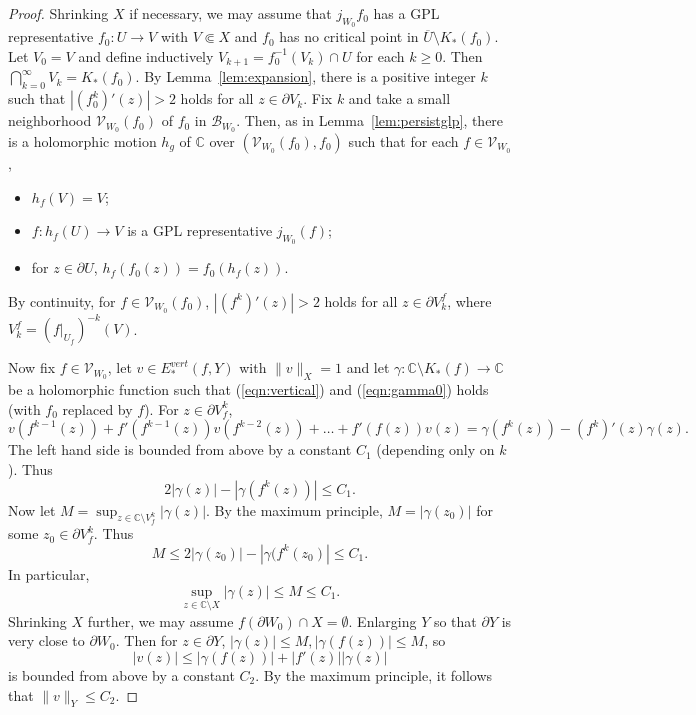 \documentclass{amsart}
\numberwithin{equation}{section}
\theoremstyle{definition}
\theoremstyle{remark}
\begin{document}
\begin{proof} Shrinking $X$ if necessary, we may assume that $j_{W_0}f_0$ has a GPL representative $f_0: U\to V$ with $V\Subset X$ and $f_0$ has no critical point in $\overline{U}\setminus K_*(f_0)$. Let $V_0=V$ and define inductively $V_{k+1}=f_0^{-1}(V_k)\cap U$ for each $k\ge 0$. Then $\bigcap_{k=0}^\infty V_k=K_*(f_0)$. By Lemma~\ref{lem:expansion}, there is a positive integer $k$ such that $|(f_0^k)'(z)|> 2$ holds for all $z\in \partial V_k$. 
Fix $k$ and take a small neighborhood $\mathcal{V}_{W_0}(f_0)$ of $f_0$ in $\mathcal{B}_{W_0}$.
Then, as in Lemma~\ref{lem:persistglp}, there is a holomorphic motion $h_g$ of $\mathbb{C}$ over $(\mathcal{V}_{W_0}(f_0), f_0)$ such that for each $f\in \mathcal{V}_{W_0}$,
\begin{itemize}
\item $h_f(V)=V$; 
\item $f: h_f(U)\to V$ is a GPL representative $j_{W_0}(f)$;     
\item for $z\in \partial U$, $h_f(f_0(z))=f_0(h_f(z))$. 
\end{itemize}
By continuity, for $f\in \mathcal{V}_{W_0}(f_0)$, $|(f^k)'(z)|>2$ holds for all $z\in \partial V_k^f$, where $V_k^f=(f|_{U_f})^{-k}(V)$.


Now fix $f\in \mathcal{V}_{W_0}$, let $v\in E^{vert}_*(f, Y)$ with $\|v\|_{X}=1$ and let $\gamma:\mathbb{C}\setminus K_*(f)\to \mathbb{C}$ be a holomorphic function such that (\ref{eqn:vertical}) and (\ref{eqn:gamma0}) holds (with $f_0$ replaced by $f$). 
For $z\in \partial V^k_f$, 
$$v(f^{k-1}(z))+f'(f^{k-1}(z))v(f^{k-2}(z))+\dots+ f'(f(z)) v(z)  =\gamma(f^k(z))-(f^k)'(z) \gamma(z).$$
The left hand side is bounded from above by a constant $C_1$ (depending only on  $k$). Thus 
$$2|\gamma(z)|-|\gamma(f^k(z))|\le C_1.$$
Now let $M=\sup_{z\in \mathbb{C}\setminus V_f^k} |\gamma(z)|$. 
By the maximum principle, $M=|\gamma(z_0)|$ for some $z_0\in\partial V^k_f$. 
Thus $$M\le 2|\gamma(z_0)|-|\gamma(f^k(z_0)|\le C_1.$$ 
In particular, $$\sup_{z\in \mathbb{C}\setminus X} |\gamma(z)|\le M\le C_1.$$
Shrinking $X$ further, we may assume $f(\partial W_0)\cap X=\emptyset$. Enlarging $Y$ so that $\partial Y$ is very close to $\partial W_0$. Then for $z\in \partial Y$, $|\gamma(z)|\le M, |\gamma(f(z))|\le M$, so
$$|v(z)|\le |\gamma(f(z))|+|f'(z)||\gamma(z)|$$
is bounded from above by a constant $C_2$. By the maximum principle, it follows that $\|v\|_Y\le C_2$. 
\end{proof}

 
\end{document}
